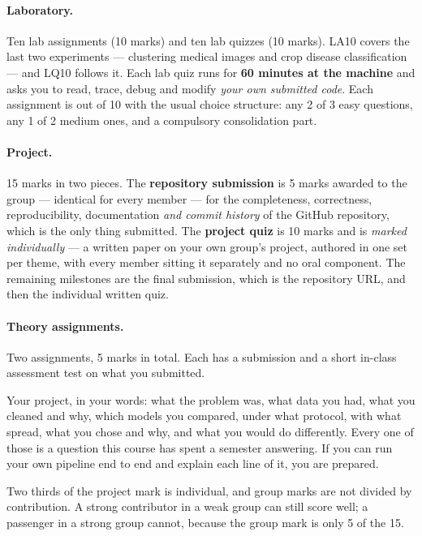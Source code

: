 \documentclass[11pt]{article}
\begin{document}
\paragraph{Laboratory.} Ten lab assignments (10 marks) and ten lab quizzes
(10 marks). LA10 covers the last two experiments --- clustering medical images
and crop disease classification --- and LQ10 follows it. Each lab quiz runs
for \textbf{60 minutes at the machine} and asks you to read, trace, debug and
modify \emph{your own submitted code}. Each assignment is out of 10 with the
usual choice structure: any 2 of 3 easy questions, any 1 of 2 medium ones, and
a compulsory consolidation part.

\paragraph{Project.} 15 marks in two pieces. The \textbf{repository
submission} is 5 marks awarded to the group --- identical for every member ---
for the completeness, correctness, reproducibility, documentation \emph{and
commit history} of the GitHub repository, which is the only thing submitted.
The \textbf{project quiz} is 10 marks and is \emph{marked individually} --- a
written paper on your own group's project, authored in one set per theme, with
every member sitting it separately and no oral component. The remaining
milestones are the final submission, which is the repository URL, and then the
individual written quiz.

\paragraph{Theory assignments.} Two assignments, 5 marks in total. Each has a
submission and a short in-class assessment test on what you submitted.

\begin{keyidea}
Your project, in your words: what the problem was, what data you had, what you
cleaned and why, which models you compared, under what protocol, with what
spread, what you chose and why, and what you would do differently. Every one
of those is a question this course has spent a semester answering. If you can
run your own pipeline end to end and explain each line of it, you are
prepared.
\end{keyidea}

\begin{caution}
Two thirds of the project mark is individual, and group marks are not divided
by contribution. A strong contributor in a weak group can still score well; a
passenger in a strong group cannot, because the group mark is only 5 of the
15.
\end{caution}
\end{document}
